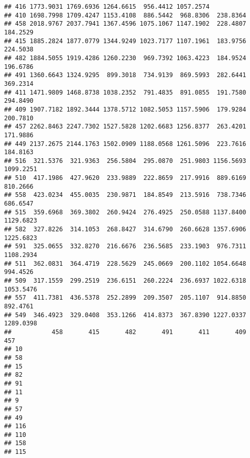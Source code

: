 \documentclass[
]{article}
\begin{document}
\begin{verbatim}
## 416 1773.9031 1769.6936 1264.6615  956.4412 1057.2574                    
## 410 1698.7998 1709.4247 1153.4108  886.5442  968.8306  238.8364          
## 458 2018.9767 2037.7941 1367.4596 1075.1067 1147.1902  228.4807  184.2529
## 415 1885.2824 1877.0779 1344.9249 1023.7177 1107.1961  183.9756  224.5038
## 482 1884.5055 1919.4286 1260.2230  969.7392 1063.4223  184.9524  196.6786
## 491 1360.6643 1324.9295  899.3018  734.9139  869.5993  282.6441  369.2314
## 411 1471.9809 1468.8738 1038.2352  791.4835  891.0855  191.7580  294.8490
## 409 1907.7182 1892.3444 1378.5712 1082.5053 1157.5906  179.9284  200.7810
## 457 2262.8463 2247.7302 1527.5828 1202.6683 1256.8377  263.4201  171.9886
## 449 2137.2675 2144.1763 1502.0909 1188.0568 1261.5096  223.7616  184.8163
## 516  321.5376  321.9363  256.5804  295.0870  251.9803 1156.5693 1099.2251
## 510  417.1986  427.9620  233.9889  222.8659  217.9916  889.6169  810.2666
## 558  423.0234  455.0035  230.9871  184.8549  213.5916  738.7346  686.6547
## 515  359.6968  369.3802  260.9424  276.4925  250.0588 1137.8400 1129.6823
## 582  327.8226  314.1053  268.8427  314.6790  260.6628 1357.6906 1225.6823
## 591  325.0655  332.8270  216.6676  236.5685  233.1903  976.7311 1108.2934
## 511  362.0831  364.4719  228.5629  245.0669  200.1102 1054.6648  994.4526
## 509  317.1559  299.2519  236.6151  260.2224  236.6937 1022.6318 1053.5476
## 557  411.7381  436.5378  252.2899  209.3507  205.1107  914.8850  892.4761
## 549  346.4923  329.0408  353.1266  414.8373  367.8390 1227.0337 1289.0398
##           458       415       482       491       411       409       457
## 10                                                                       
## 58                                                                       
## 15                                                                       
## 82                                                                       
## 91                                                                       
## 11                                                                       
## 9                                                                        
## 57                                                                       
## 49                                                                       
## 116                                                                      
## 110                                                                      
## 158                                                                      
## 115                                                                      

\end{verbatim}
\end{document}
